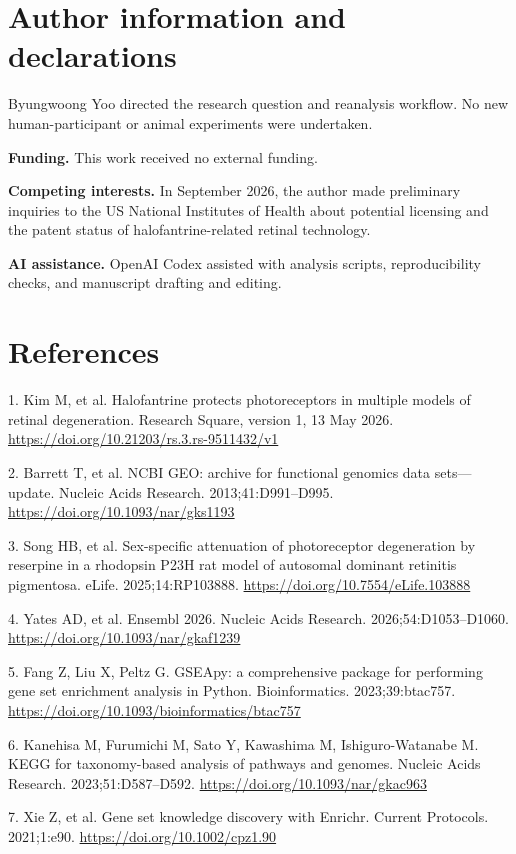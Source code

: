 \documentclass[a4paper,10pt]{article}
\begin{document}
\section*{Author information and declarations}
Byungwoong Yoo directed the research question and reanalysis workflow. No new human-participant or animal experiments were undertaken.

\textbf{Funding.} This work received no external funding.

\textbf{Competing interests.} In September 2026, the author made preliminary inquiries to the US National Institutes of Health about potential licensing and the patent status of halofantrine-related retinal technology.

\textbf{AI assistance.} OpenAI Codex assisted with analysis scripts, reproducibility checks, and manuscript drafting and editing.

\section*{References}
1. Kim M, et al. Halofantrine protects photoreceptors in multiple models of retinal degeneration. Research Square, version 1, 13 May 2026. \url{https://doi.org/10.21203/rs.3.rs-9511432/v1}

2. Barrett T, et al. NCBI GEO: archive for functional genomics data sets—update. Nucleic Acids Research. 2013;41:D991–D995. \url{https://doi.org/10.1093/nar/gks1193}

3. Song HB, et al. Sex-specific attenuation of photoreceptor degeneration by reserpine in a rhodopsin P23H rat model of autosomal dominant retinitis pigmentosa. eLife. 2025;14:RP103888. \url{https://doi.org/10.7554/eLife.103888}

4. Yates AD, et al. Ensembl 2026. Nucleic Acids Research. 2026;54:D1053–D1060. \url{https://doi.org/10.1093/nar/gkaf1239}

5. Fang Z, Liu X, Peltz G. GSEApy: a comprehensive package for performing gene set enrichment analysis in Python. Bioinformatics. 2023;39:btac757. \url{https://doi.org/10.1093/bioinformatics/btac757}

6. Kanehisa M, Furumichi M, Sato Y, Kawashima M, Ishiguro-Watanabe M. KEGG for taxonomy-based analysis of pathways and genomes. Nucleic Acids Research. 2023;51:D587–D592. \url{https://doi.org/10.1093/nar/gkac963}

7. Xie Z, et al. Gene set knowledge discovery with Enrichr. Current Protocols. 2021;1:e90. \url{https://doi.org/10.1002/cpz1.90}
\end{document}
